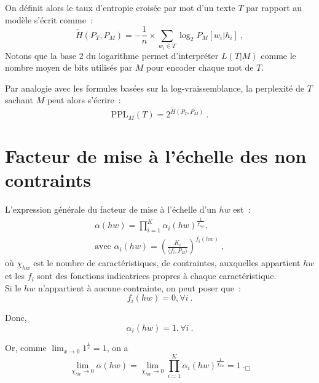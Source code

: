 On définit alors le taux d'entropie croisée par mot d'un texte $T$ par rapport
au modèle s'écrit comme~:
\begin{equation}
\widetilde{H}(P_T,P_M) = - \frac{1}{n} \times \sum_{w_i \in T} \log_2
P_M[w_i|h_i]~,
\end{equation}
Notons que la base $2$ du logarithme permet d'interpréter $L(T|M)$ comme le
nombre moyen de bits utilisés par $M$ pour encoder chaque mot de $T$.

Par analogie avec les formules basées sur la log-vraissemblance, la perplexité
de $T$ sachant $M$ peut alors s'écrire~:
\begin{equation}
 \mbox{PPL}_M(T) = 2^{\widetilde{H}(P_T,P_M)}~.
\end{equation}

\section{Facteur de mise à l'échelle des \ngrammes{} non contraints}
\label{sec:scale_factor_1}

L'expression générale du facteur de mise à l'échelle d'un \ngramme{} $hw$ est~:
\begin{eqnarray}
 \alpha(hw) = \prod_{i=1}^{K}
		\alpha_i(hw)^{\frac{1}{\chi_{hw}}},\\
\mbox{avec } \alpha_i(hw) = \left(
                              \frac{K_i}{\langle{}f_i,P_B\rangle{}}
		            \right)^{f_i(hw)}~,
\label{eq:mdi_demo_a_1}
\end{eqnarray}
où $\chi_{hw}$ est le nombre de caractéristiques,
\cad de contraintes, auxquelles appartient $hw$ et les $f_i$ sont des
fonctions indicatrices propres à chaque caractéristique.\\

Si le \ngramme{} $hw$ n'appartient à aucune contrainte, on peut poser que~:
\begin{equation}
 f_i(hw) = 0, \forall i~.
\end{equation}

Donc,
\begin{equation}
 \alpha_i(hw) = 1, \forall i~.
\end{equation}

Or, comme $\displaystyle\lim_{x\to0} 1^{\frac{1}{x}} = 1$, on a
\begin{equation}
 \lim_{\chi_{hw}\to0} \alpha(hw) = \lim_{\chi_{hw}\to0} \prod_{i=1}^{K}
	\alpha_i(hw)^{\frac{1}{\chi_{hw}}} = 1~._\Box
\end{equation}




